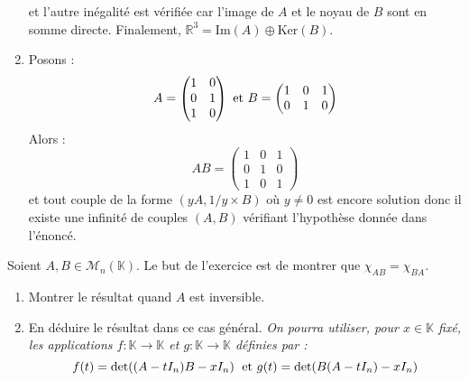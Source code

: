 \documentclass[a4paper,10pt]{report}
\begin{document}
\begin{enumerate}
et l'autre inégalité est vérifiée car l'image de $A$ et le noyau de $B$ sont en somme directe. Finalement, $\mathbb{R}^3 = \textrm{Im}(A) \oplus \textrm{Ker}(B)$.
\item Posons :
$$ A  = \begin{pmatrix}
1 & 0 \\
0 & 1\\
1 & 0 \\
\end{pmatrix} 
\hbox{ et } B = \begin{pmatrix}
1 & 0 & 1 \\
0 & 1 & 0
\end{pmatrix}$$
Alors :
$$ AB = \begin{pmatrix}
1 & 0 & 1 \\
0 & 1 & 0 \\
1 & 0 & 1 
\end{pmatrix}$$
et tout couple de la forme $(yA, 1/y \times B)$ où $y \neq 0$ est encore solution donc il existe une infinité de couples $(A,B)$ vérifiant l'hypothèse donnée dans l'énoncé.
\end{enumerate}

\begin{Exa} Soient $A,B \in \mathcal{M}_{n}(\mathbb{K})$. Le but de l'exercice est de montrer que $\chi_{AB} = \chi_{BA}$.
\begin{enumerate}
\item Montrer le résultat quand $A$ est inversible.
\item En déduire le résultat dans ce cas général. \textit{On pourra utiliser, pour $x \in \mathbb{K}$ fixé, les applications $f : \mathbb{K} \rightarrow \mathbb{K}$ et $g : \mathbb{K} \rightarrow \mathbb{K}$ définies par :}
$$ f(t) = \textrm{det}((A-t I_n)B -x I_n) \; \hbox{ et } g(t) = \textrm{det}(B(A-tI_n)-xI_n)$$
\end{enumerate}
\end{Exa}

\corr 
\end{document}

